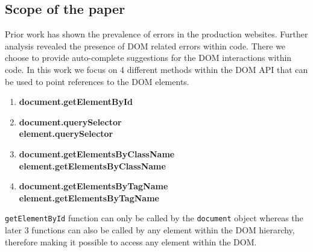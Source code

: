 	\subsection{Scope of the paper}
	\label{Sec:Scope}
	
	Prior work  has shown the prevalence of \javascript errors in the production websites.\cite{ocariza2011javascript} Further analysis revealed the presence of DOM related errors within \javascript code.\cite{ocariza2013empirical} There we choose to provide auto-complete suggestions for the DOM interactions within \javascript code. In this work we focus on 4 different methods within the DOM API that can be used to point references to the DOM elements.
	
	\begin{enumerate}
		
		\item \textbf{document.getElementById} 
		\item \textbf{document.querySelector} \\ \textbf{element.querySelector}
		\item \textbf{document.getElementsByClassName} \\ \textbf{element.getElementsByClassName}
		\item \textbf{document.getElementsByTagName} \\ \textbf{element.getElementsByTagName}
		
	\end{enumerate}
	
	\texttt{getElementById} function can only be called by the \texttt{document} object whereas the later 3 functions can also be called by any element within the DOM hierarchy, therefore making it possible to access any element within the DOM.
	
	
	